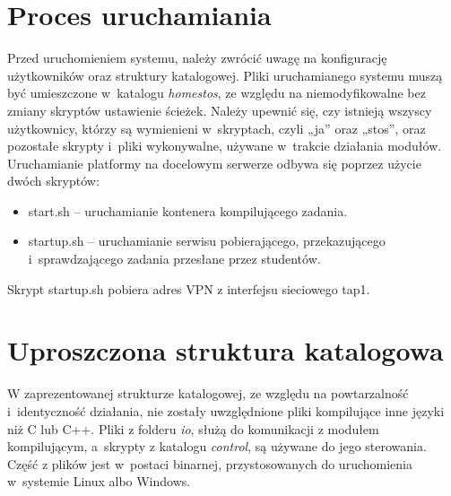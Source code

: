 \section{Proces uruchamiania}
Przed uruchomieniem systemu, należy zwrócić uwagę na konfigurację użytkowników oraz struktury katalogowej. Pliki uruchamianego systemu muszą być umieszczone w~katalogu \textit{\/home\/stos}, ze względu na niemodyfikowalne bez zmiany skryptów ustawienie ścieżek. Należy upewnić się, czy istnieją wszyscy użytkownicy, którzy są wymienieni w~skryptach, czyli „ja” oraz „stos”, oraz pozostałe skrypty i~pliki wykonywalne, używane w~trakcie działania modułów.
\newline \indent Uruchamianie platformy na docelowym serwerze odbywa się poprzez użycie dwóch skryptów:
\begin{itemize}
    \item start.sh -- uruchamianie kontenera kompilującego zadania.
    \item startup.sh -- uruchamianie serwisu pobierającego, przekazującego i~sprawdzającego zadania przesłane przez studentów.
\end{itemize}
Skrypt startup.sh pobiera adres VPN z interfejsu sieciowego tap1. 

\section{Uproszczona struktura katalogowa}
W zaprezentowanej strukturze katalogowej, ze względu na powtarzalność i~identyczność działania, nie zostały uwzględnione pliki kompilujące inne języki niż C lub C++. Pliki z folderu \textit{io}, służą do komunikacji z modułem kompilującym, a~skrypty z katalogu \textit{control}, są używane do jego sterowania. Część z plików jest w~postaci binarnej, przystosowanych do uruchomienia w~systemie Linux albo Windows.